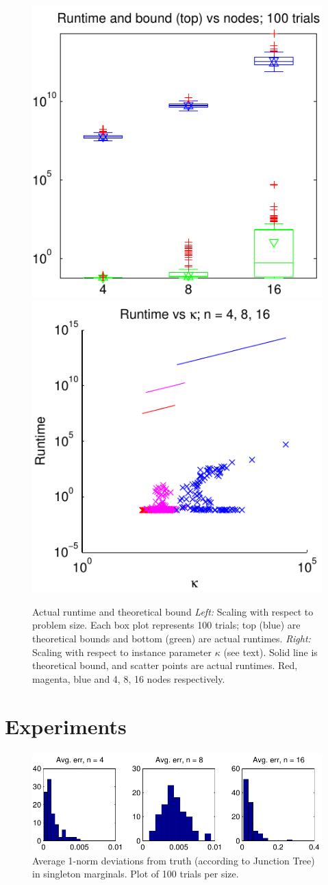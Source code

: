 \documentclass[english]{article}
\newcommand{\+}[1]{\ensuremath{\boldsymbol{\mathrm{#1}}}}
\begin{document}
\begin{figure}
\centering
\includegraphics[width=0.49\linewidth, clip]{nodes_time}
\includegraphics[width=0.49\linewidth, clip]{kappa_time}
\caption{Actual runtime and theoretical bound  \emph{Left:} Scaling with respect to problem size. Each box plot represents 100 trials; top (blue) are theoretical bounds and bottom (green) are actual runtimes. \emph{Right:} Scaling with respect to instance parameter $\kappa$ (see text). Solid line is theoretical bound, and scatter points are actual runtimes. Red, magenta, blue and 4, 8, 16 nodes respectively.} \label{fig:time}
\end{figure}
\section{Experiments}
\begin{figure}
\centering
\includegraphics[width=\linewidth, clip]{errors}
\caption{Average 1-norm deviations from truth (according to Junction Tree) in singleton marginals. Plot of 100 trials per size.} \label{fig:errors}
\end{figure}
\end{document}
